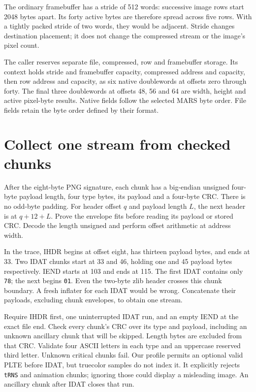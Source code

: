 The ordinary framebuffer has a stride of 512 words: successive image rows
start 2048 bytes apart. Its forty active bytes are therefore spread across
five rows. With a tightly packed stride of two words, they would be adjacent.
Stride changes destination placement; it does not change the compressed stream
or the image's pixel count.

The caller reserves separate file, compressed, row and framebuffer storage.
Its context holds stride and framebuffer capacity, compressed address and
capacity, then row address and capacity, as six native doublewords at offsets
zero through forty. The final three doublewords at offsets 48, 56 and 64 are
width, height and active pixel-byte results. Native fields follow the selected
MARS byte order. File fields retain the byte order defined by their format.

\section{Collect one stream from checked chunks}

After the eight-byte PNG signature, each chunk has a big-endian unsigned
four-byte payload length, four type bytes, its payload and a four-byte CRC.
There is no odd-byte padding. For header offset $q$ and payload length $L$,
the next header is at $q+12+L$. Prove the envelope fits before reading its
payload or stored CRC. Decode the length unsigned and perform offset arithmetic
at address width.

In the trace, IHDR begins at offset eight, has thirteen payload bytes, and
ends at 33. Two IDAT chunks start at 33 and 46, holding one and 45 payload
bytes respectively. IEND starts at 103 and ends at 115. The first IDAT contains
only \texttt{78}; the next begins \texttt{01}. Even the two-byte zlib header
crosses this chunk boundary. A fresh inflater for each IDAT would be wrong.
Concatenate their payloads, excluding chunk envelopes, to obtain one stream.

Require IHDR first, one uninterrupted IDAT run, and an empty IEND at the exact
file end. Check every chunk's CRC over its type and payload, including an
unknown ancillary chunk that will be skipped. Length bytes are excluded from
that CRC. Validate four ASCII letters in each type and an uppercase reserved
third letter. Unknown critical chunks fail. Our profile permits an optional
valid PLTE before IDAT, but truecolor samples do not index it. It explicitly
rejects \texttt{tRNS} and animation chunks; ignoring those could display a
misleading image. An ancillary chunk after IDAT closes that run.


